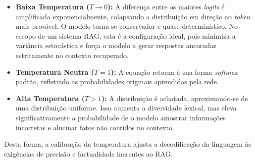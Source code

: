 \begin{itemize}
  \item \textbf{Baixa Temperatura ($T \to 0$):} A diferença entre os maiores \textit{logits} é amplificada exponencialmente, colapsando a distribuição em direção ao \textit{token} mais provável. O modelo torna-se conservador e quase determinístico. No escopo de um sistema RAG, esta é a configuração ideal, pois minimiza a variância estocástica e força o modelo a gerar respostas ancoradas estritamente no contexto recuperado.
  \item \textbf{Temperatura Neutra ($T = 1$):} A equação retorna à sua forma \textit{softmax} padrão, refletindo as probabilidades originais aprendidas pela rede.
  \item \textbf{Alta Temperatura ($T > 1$):} A distribuição é achatada, aproximando-se de uma distribuição uniforme. Isso aumenta a diversidade lexical, mas eleva significativamente a probabilidade de o modelo amostrar informações incorretas e alucinar fatos não contidos no contexto.
\end{itemize}

Desta forma, a calibração da temperatura ajusta a decodificação da linguagem às exigências de precisão e factualidade inerentes ao RAG.
